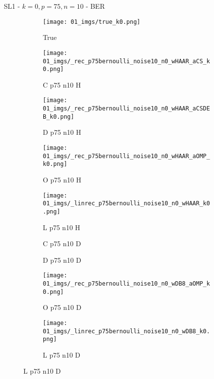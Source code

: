 \begin{frame}{SL1 - $k=0,p=75,n=10$ - BER}{}
\begin{figure}
\begin{subfigure}{0.1\textwidth}
\texttt{[image: 01\_imgs/true\_k0.png]}
\caption*{\Tiny True}
\end{subfigure}
\begin{subfigure}{0.1\textwidth}
\texttt{[image: 01\_imgs/\_rec\_p75bernoulli\_noise10\_n0\_wHAAR\_aCS\_k0.png]}
\caption*{\Tiny C p75 n10 H}
\end{subfigure}
\begin{subfigure}{0.1\textwidth}
\texttt{[image: 01\_imgs/\_rec\_p75bernoulli\_noise10\_n0\_wHAAR\_aCSDEB\_k0.png]}
\caption*{\Tiny D p75 n10 H}
\end{subfigure}
\begin{subfigure}{0.1\textwidth}
\texttt{[image: 01\_imgs/\_rec\_p75bernoulli\_noise10\_n0\_wHAAR\_aOMP\_k0.png]}
\caption*{\Tiny O p75 n10 H}
\end{subfigure}
\begin{subfigure}{0.1\textwidth}
\texttt{[image: 01\_imgs/\_linrec\_p75bernoulli\_noise10\_n0\_wHAAR\_k0.png]}
\caption*{\Tiny L p75 n10 H}
\end{subfigure}
\begin{subfigure}{0.1\textwidth}
\caption*{\Tiny C p75 n10 D}
\end{subfigure}
\begin{subfigure}{0.1\textwidth}
\caption*{\Tiny D p75 n10 D}
\end{subfigure}
\begin{subfigure}{0.1\textwidth}
\texttt{[image: 01\_imgs/\_rec\_p75bernoulli\_noise10\_n0\_wDB8\_aOMP\_k0.png]}
\caption*{\Tiny O p75 n10 D}
\end{subfigure}
\begin{subfigure}{0.1\textwidth}
\texttt{[image: 01\_imgs/\_linrec\_p75bernoulli\_noise10\_n0\_wDB8\_k0.png]}
\caption*{\Tiny L p75 n10 D}
\end{subfigure}
\end{figure}
\end{frame}


